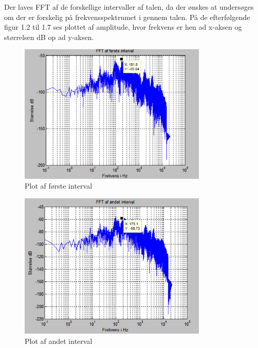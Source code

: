 Der laves FFT af de forskellige intervaller af talen, da der ønskes at undersøges om der er forskelig på frekvensspektrumet i gennem talen. På de efterfølgende figur 1.2 til 1.7 ses plottet af amplitude, hvor frekvens er hen ad x-aksen og størrelsen dB op ad y-aksen. 


\begin{figure}[H]
	\centering
	\includegraphics[width=0.8\textwidth]{Figur/Snip20151201_6}
	\caption{Plot af første interval}
\end{figure}

\begin{figure}[H]
	\centering
	\includegraphics[width=0.8\textwidth]{Figur/Snip20151201_7}
	\caption{Plot af andet interval}
\end{figure}

